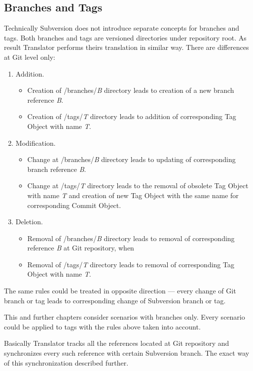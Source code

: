 \subsection{Branches and Tags}

Technically Subversion does not introduce separate concepts for branches and tags. Both branches and tags are versioned directories under repository root. As result Translator performs theirs translation in similar way. There are differences at Git level only:
\begin{enumerate}
	\compactlist
	\item Addition.
	\begin{itemize}
		\item Creation of /branches/\emph{B} directory leads to creation of a new branch reference \emph{B}.
		\item Creation of /tags/\emph{T} directory leads to addition of corresponding Tag Object with name \emph{T}.
	\end{itemize}
	\item Modification.
	\begin{itemize}
		\item Change at /branches/\emph{B} directory leads to updating of corresponding branch reference \emph{B}.
		\item Change at /tags/\emph{T} directory leads to the removal of obsolete Tag Object with name \emph{T} and creation of new Tag Object with the same name for corresponding Commit Object.
	\end{itemize}
	\item Deletion.
	\begin{itemize}
		\item Removal of /branches/\emph{B} directory leads to removal of corresponding reference \emph{B} at Git repository, when
		\item Removal of /tags/\emph{T} directory leads to removal of corresponding Tag Object with name \emph{T}.
	\end{itemize}
\end{enumerate}

The same rules could be treated in opposite direction --- every change of Git branch or tag leads to corresponding change of Subversion branch or tag.

This and further chapters consider scenarios with branches only. Every scenario could be applied to tags with the rules above taken into account.

Basically Translator tracks all the references located at Git repository and synchronizes every such reference with certain Subversion branch. The exact way of this synchronization described further.

